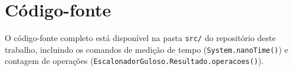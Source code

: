 \documentclass[12pt]{article}
\begin{document}
\section{Código-fonte}

O código-fonte completo está disponível na pasta \texttt{src/} do
repositório deste trabalho, incluindo os comandos de medição de tempo
(\texttt{System.nanoTime()}) e contagem de operações
(\texttt{EscalonadorGuloso.Resultado.operacoes()}).



\end{document}
